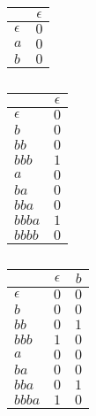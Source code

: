 \begin{table}
\centering

\begin{subtable}[h]{.23\textwidth}
\centering
\begin{tabular}{ | l || c | }
\hline
           & $\epsilon$ \\ \hline \hline
$\epsilon$ & $0$        \\ \hline \hline
$a$        & $0$        \\
$b$        & $0$        \\
\hline
\end{tabular}
\caption{} \label{tbl:observation_1}
\end{subtable}
%
%
\hfill
\begin{subtable}[h]{.23\textwidth}
\centering
\begin{tabular}{ | l || c | }
\hline
           & $\epsilon$ \\ \hline \hline
$\epsilon$ & $0$        \\
$b$        & $0$        \\
$bb$       & $0$        \\
$bbb$      & $1$        \\ \hline \hline
$a$        & $0$        \\
$ba$       & $0$        \\
$bba$      & $0$        \\
$bbba$     & $1$        \\
$bbbb$     & $0$        \\
\hline
\end{tabular}
\caption{} \label{tbl:observation_2}
\end{subtable}
%
%
\hfill
\begin{subtable}[h]{.23\textwidth}
\centering
\begin{tabular}{ | l || c | c | }
\hline
           & $\epsilon$ & $b$ \\ \hline \hline
$\epsilon$ & $0$        & $0$ \\
$b$        & $0$        & $0$ \\
$bb$       & $0$        & $1$ \\
$bbb$      & $1$        & $0$ \\ \hline \hline
$a$        & $0$        & $0$ \\
$ba$       & $0$        & $0$ \\
$bba$      & $0$        & $1$ \\
$bbba$     & $1$        & $0$ \\

\end{tabular}
\end{subtable}
\end{table}
